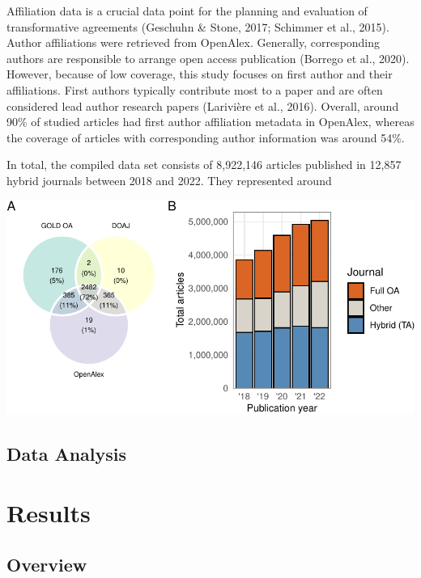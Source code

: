 \documentclass[a4paper,man,floatsintext,longtable,noextraspace,12pt]{apa6}
\begin{document}
Affiliation data is a crucial data point for the planning and evaluation
of transformative agreements (Geschuhn \& Stone, 2017; Schimmer et al.,
2015). Author affiliations were retrieved from OpenAlex. Generally,
corresponding authors are responsible to arrange open access publication
(Borrego et al., 2020). However, because of low coverage, this study
focuses on first author and their affiliations. First authors typically
contribute most to a paper and are often considered lead author research
papers (Larivière et al., 2016). Overall, around 90\% of studied
articles had first author affiliation metadata in OpenAlex, whereas the
coverage of articles with corresponding author information was around
54\%.

In total, the compiled data set consists of 8,922,146 articles published
in 12,857 hybrid journals between 2018 and 2022. They represented around

\begin{center}\includegraphics[width=0.99\linewidth]{fig/method_fig-1} \end{center}

\hypertarget{data-analysis}{%
\subsection{Data Analysis}\label{data-analysis}}

\hypertarget{results}{%
\section{Results}\label{results}}

\hypertarget{overview}{%
\subsection{Overview}\label{overview}}
\end{document}
